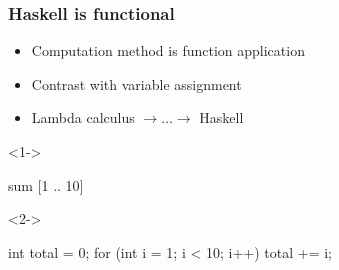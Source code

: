 \documentclass[17pt]{beamer}
\renewcommand{\(}[1]{\begin{columns}[#1]}
\renewcommand{\)}{\end{columns}}
\newcommand{\<}[1]{\begin{column}{#1}}
\renewcommand{\>}{\end{column}}
\begin{document}
\begin{frame}[fragile]
  \frametitle{Haskell is functional}
  \begin{minipage}[t][.2\textheight]{\textwidth}
    \begin{itemize}[<+->]
      \item Computation method is function application
      \item Contrast with variable assignment
      \item Lambda calculus $\rightarrow \ldots \rightarrow$ Haskell
    \end{itemize}
  \end{minipage}
  \begin{minipage}[c][.5\textheight]{\textwidth}
    \begin{center}
      \begin{onlyenv}<1->
        \begin{code}
sum [1 .. 10]
        \end{code}
      \end{onlyenv}
      \begin{onlyenv}<2->
        \begin{ccode}
int total = 0;
for (int i = 1; i < 10; i++)
  total += i;
        \end{ccode}
      \end{onlyenv}
  \end{center}
  \end{minipage}
\end{frame}
\end{document}
